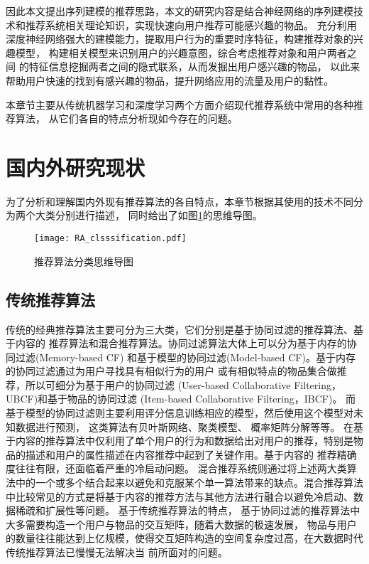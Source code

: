 因此本文提出序列建模的推荐思路，本文的研究内容是结合神经网络的序列建模技术和推荐系统相关理论知识，实现快速向用户推荐可能感兴趣的物品。%
充分利用深度神经网络强大的建模能力，提取用户行为的重要时序特征，构建推荐对象的兴趣模型，%
构建相关模型来识别用户的兴趣意图，综合考虑推荐对象和用户两者之间%
的特征信息挖掘两者之间的隐式联系，从而发掘出用户感兴趣的物品，
以此来帮助用户快速的找到有感兴趣的物品，提升网络应用的流量及用户的黏性。%






%
本章节主要从传统机器学习和深度学习两个方面介绍现代推荐系统中常用的各种推荐算法，%
从它们各自的特点分析现如今存在的问题。

\section{国内外研究现状}

为了分析和理解国内外现有推荐算法的各自特点，本章节根据其使用的技术不同分为两个大类分别进行描述，
同时给出了如图\ref{fig:RA_clsssification}的思维导图。

\begin{figure}[htb]
  \centering
  \texttt{[image: RA\_clsssification.pdf]}\\
  \caption{推荐算法分类思维导图}
  \label{fig:RA_clsssification}
\end{figure}

\subsection{传统推荐算法}

传统的经典推荐算法主要可分为三大类，它们分别是基于协同过滤的推荐算法、基于内容的%
推荐算法和混合推荐算法。协同过滤算法大体上可以分为基于内存的协同过滤(Memory-based CF)%
和基于模型的协同过滤(Model-based CF)。基于内存的协同过滤通过为用户寻找具有相似行为的用户%
或有相似特点的物品集合做推荐，所以可细分为基于用户的协同过滤%
(User-based Collaborative Filtering，UBCF)和基于物品的协同过滤%
(Item-based Collaborative Filtering，IBCF)。
而基于模型的协同过滤则主要利用评分信息训练相应的模型，然后使用这个模型对未知数据进行预测，%
这类算法有贝叶斯网络、聚类模型、%
概率矩阵分解等等。
在基于内容的推荐算法中仅利用了单个用户的行为和数据给出对用户的推荐，特别是物品的描述和用户的属性描述在内容推荐中起到了关键作用。基于内容的
推荐精确度往往有限，还面临着严重的冷启动问题。
混合推荐系统则通过将上述两大类算法中的一个或多个结合起来以避免和克服某个单一算法带来的缺点。混合推荐算法中比较常见的方式是将基于内容的推荐方法与其他方法进行融合以避免冷启动、数据稀疏和扩展性等问题。
基于传统推荐算法的特点，%
基于协同过滤的推荐算法中大多需要构造一个用户与物品的交互矩阵，随着大数据的极速发展，%
物品与用户的数量往往能达到上亿规模，使得交互矩阵构造的空间复杂度过高，在大数据时代传统推荐算法已慢慢无法解决当%
前所面对的问题。

